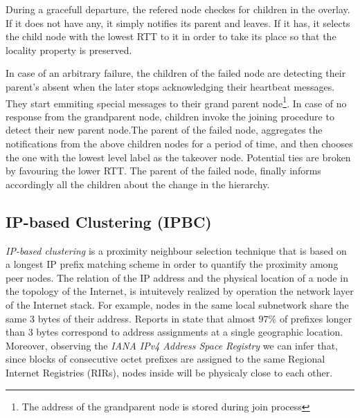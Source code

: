 \documentclass[a4paper,10pt]{article}
\begin{document}
During a gracefull departure, the refered node checkes for children in the overlay. If it does not have any, it simply notifies its parent and leaves. If it has, it selects the child node with the lowest RTT to it in order to take its place so that the locality property is preserved.

In case of an arbitrary failure, the children of the failed node are detecting their parent's absent when the later stops acknowledging their heartbeat messages. They start emmiting special messages to their grand parent node\footnote{The address of the grandparent node is stored during join process}. In case of no response from the grandparent node, children invoke the joining procedure to detect their new parent node.The parent of the failed node, aggregates the notifications from the above children nodes for a period of time, and then chooses the one with the lowest level label as the takeover node. Potential ties are broken by favouring the lower RTT. The parent of the failed node, finally informs accordingly all the children about the change in the hierarchy.

\subsection{IP-based Clustering (IPBC)}
\emph{IP-based clustering} \cite{karwaczynski_ipbc_2007} is a proximity neighbour selection technique that is based on a longest IP prefix matching scheme in order to quantify the proximity among peer nodes. The relation of the IP address and the physical location of a node in the topology of the Internet, is intuitevely realized by operation the network layer of the Internet stack. For example, nodes in the same local subnetwork share the same 3 bytes of their address. Reports in \cite{freedman_iploc_2005} state that almost $97\%$ of prefixes longer than 3 bytes correspond to address assignments at a single geographic location. Moreover, observing the \emph{IANA IPv4 Address Space Registry} we can infer that, since blocks of consecutive octet prefixes are assigned to the same Regional Internet Registries (RIRs), nodes inside will be physicaly close to each other.
\end{document}

